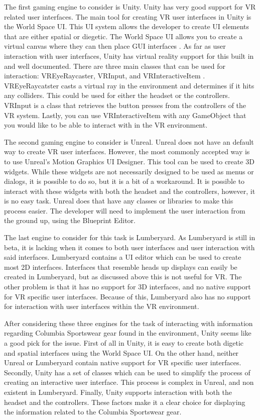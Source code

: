 \documentclass[10pt,journal,compsoc,onecolumn, draftclsnofoot]{IEEEtran}
\begin{document}
The first gaming engine to consider is Unity.
Unity has very good support for VR related user interfaces.
The main tool for creating VR user interfaces in Unity is the World Space UI.
This UI system allows the developer to create UI elements that are either spatial or diegetic.
The World Space UI allows you to create a virtual canvas where they can then place GUI interfaces \cite{unity_world_space}.
As far as user interaction with user interfaces, Unity has virtual reality support for this built in and well documented.
There are three main classes that can be used for interaction: VREyeRaycaster, VRInput, and VRInteractiveItem \cite{unity_interface_interaction}.
VREyeRaycatster casts a virtual ray in the environment and determines if it hits any colliders.
This could be used for either the headset or the controllers.
VRInput is a class that retrieves the button presses from the controllers of the VR system.
Lastly, you can use VRInteractiveItem with any GameObject that you would like to be able to interact with in the VR environment.

The second gaming engine to consider is Unreal.
Unreal does not have an default way to create VR user interfaces.
However, the most commonly accepted way is to use Unreal's Motion Graphics UI Designer.
This tool can be used to create 3D widgets.
While these widgets are not necessarily designed to be used as menus or dialogs, it is possible to do so, but it is a bit of a workaround.
It is possible to interact with these widgets with both the headset and the controllers, however, it is no easy task.
Unreal does that have any classes or libraries to make this process easier.
The developer will need to implement the user interaction from the ground up, using the Blueprint Editor.

The last engine to consider for this task is Lumberyard.
As Lumberyard is still in beta, it is lacking when it comes to both user interfaces and user interaction with said interfaces.
Lumberyard contains a UI editor which can be used to create most 2D interfaces.
Interfaces that resemble heads up displays can easily be created in Lumberyard, but as discussed above this is not useful for VR.
The other problem is that it has no support for 3D interfaces, and no native support for VR specific user interfaces.
Because of this, Lumberyard also has no support for interaction with user interfaces within the VR environment.

After considering these three engines for the task of interacting with information regarding Columbia Sportswear gear found in the environment, Unity seems like a good pick for the issue.
First of all in Unity, it is easy to create both digetic and spatial interfaces using the World Space UI.
On the other hand, neither Unreal or Lumberyard contain native support for VR specific user interfaces.
Secondly, Unity has a set of classes which can be used to simplify the process of creating an interactive user interface.
This process is complex in Unreal, and non existent in Lumberyard.
Finally, Unity supports interaction with both the headset and the controllers.
These factors make it a clear choice for displaying the information related to the Columbia Sportswear gear.
\end{document}
